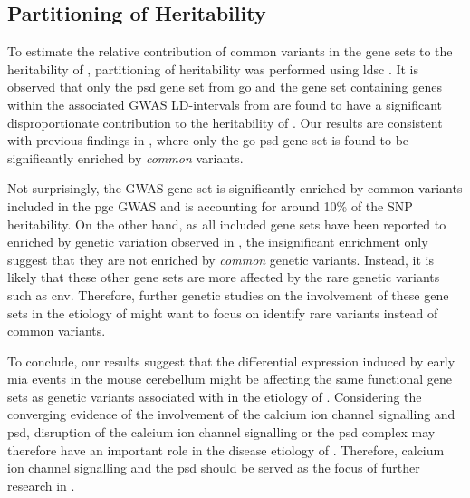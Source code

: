 \subsection{Partitioning of Heritability}
To estimate the relative contribution of common variants in the gene sets to the heritability of , partitioning of heritability was performed using \gls{ldsc} \citet{Bulik-Sullivan2015}.
It is observed that only the \gls{psd} gene set from \gls{go} and the gene set containing genes within the associated \gls{GWAS} LD-intervals from \citet{Purcell2014} are found to have a significant disproportionate contribution to the heritability of .
Our results are consistent with previous findings in \citet{Consortium2015a}, where only the \gls{go} \gls{psd} gene set is found to be significantly enriched by \emph{common} variants. 

Not surprisingly, the \gls{GWAS} gene set is significantly enriched by common variants included in the \gls{pgc}  \gls{GWAS} and is accounting for around 10\% of the \gls{SNP} heritability.
On the other hand, as all included gene sets have been reported to enriched by genetic variation observed in , the insignificant enrichment only suggest that they are not enriched by \emph{common} genetic variants. 
Instead, it is likely that these other gene sets are more affected by the rare genetic variants such as \gls{cnv}.
Therefore, further genetic studies on the involvement of these gene sets in the etiology of  might want to focus on identify rare variants instead of common variants. 

To conclude, our results suggest that the differential expression induced by early \gls{mia} events in the mouse cerebellum might be affecting the same functional gene sets as genetic variants associated with  in the etiology of .
Considering the converging evidence of the involvement of the calcium ion channel signalling and \gls{psd}, disruption of the calcium ion channel signalling or the \gls{psd} complex may therefore have an important role in the disease etiology of .
Therefore, calcium ion channel signalling and the \gls{psd} should be served as the focus of further research in .

